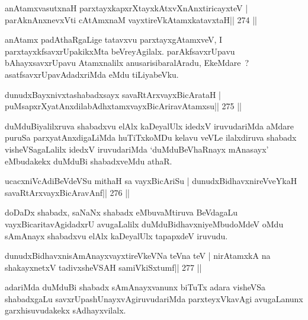 \begin{shl}
anAtamxvasutxnaH parxtayxkapxrXtayxkAtxvXnAnxtiricayxteV |
parAknAnxnevxVti cA\s\s tAmxnaM vayxtireVkAtamxkatavxtaH\hfill || 274 ||
\end{shl}

\begin{artha}
anAtamx padAthaRgaLige tatavxvu parxtayxgAtamxveV, I parxtayxkfsavxrUpakikxMta beVreyAgilalx. parAkfsavxrUpavu bAhayxsavxrUpavu Atamxnalilx anusarisibaralAradu, EkeMdare~? asatfsavxrUpavAdadxriMda eMdu tiLiyabeVku.
\end{artha}


\begin{shl}
dunudxBayxnivxtashabadxsayx savaRtArxvayxBicArataH |
puMsapxrXyatAnxdilabAdhxtamxvayxBicAriravAtamxsu\hfill || 275 ||
\end{shl}

\begin{artha}
duMduBiyalilxruva shabadxvu elAlx kaDeyalUlx idedxV iruvudariMda aMdare puruSa parxyatAnxdigaLiMda huTiTxkoMDu kelavu veVLe ilalxdiruva shabadx visheVSagaLalilx idedxV iruvudariMda `duMduBeVhaRnayx mAnasayx' eMbudakekx duMduBi shabadxveMdu athaR.
\end{artha}


\begin{shl}
ucacxniVcAdiBeVdeVSu mithaH sa vayxBicAriSu |
dunudxBidhavxnireVveYkaH savaRtArxvayxBicAravAnf\hfill || 276 ||
\end{shl}

\begin{artha}
doDaDx shabadx, saNaNx shabadx eMbuvaMtiruva BeVdagaLu vayxBicaritavAgidadxrU avugaLalilx duMduBidhavxniyeMbudoMdeV oMdu sAmAnayx shabadxvu elAlx kaDeyalUlx tapapxdeV iruvudu.
\end{artha}

\begin{shl}
dunudxBidhavxnisAmAnayxvayxtireVkeVNa teVna teV |
nirAtamxkA na shakayxnetxV tadivxsheVSAH samiVkiSxtumf\hfill || 277 ||
\end{shl}

\begin{artha}
adariMda duMduBi shabadx sAmAnayxvanunx biTuTx adara visheVSa shabadxgaLu savxrUpashUnayxvAgiruvudariMda parxteyxVkavAgi avugaLanunx garxhisuvudakekx sAdhayxvilalx.
\end{artha}

